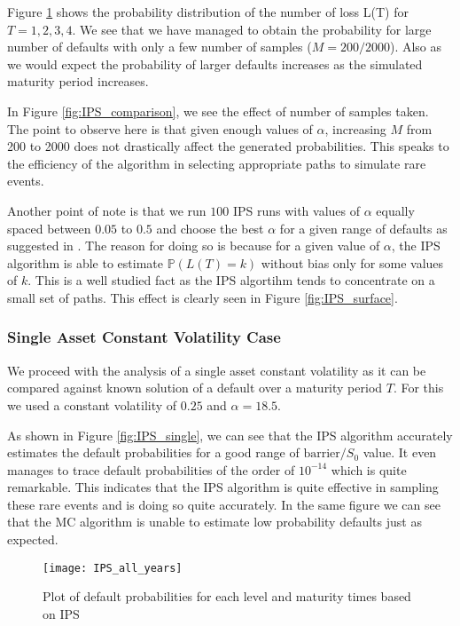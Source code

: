Figure \ref{fig:IPS_all} shows the probability distribution of the number of
loss L(T) for $T = 1, 2, 3, 4$. We see that we have managed to obtain the
probability for large number of defaults with only a few number of samples ($M =
200/2000$). Also as we would expect the probability of larger defaults increases
as the simulated maturity period increases.

In Figure \ref{fig:IPS_comparison}, we see the effect of number of samples
taken. The point to observe here is that given enough values of $\alpha$, 
increasing $M$ from 200 to 2000 does not drastically affect the generated
probabilities. This speaks to the efficiency of the algorithm in selecting
appropriate paths to simulate rare events.

Another point of note is that we run $100$ IPS runs with values of $\alpha$
equally spaced between $0.05$ to $0.5$ and choose the best $\alpha$ for a given
range of defaults as suggested in \cite{carmona2009importance}. The reason for 
doing so is because for a given value of $\alpha$, the IPS algorithm is able to 
estimate $\mathbb{P}(L(T) = k)$ without bias only for some values of $k$. This
is a well studied fact as the IPS algortihm tends to concentrate on a small set
of paths. This effect is clearly seen in Figure \ref{fig:IPS_surface}.

\subsubsection{Single Asset Constant Volatility Case}
We proceed with the analysis of a single asset constant volatility as it can be
compared against known solution of a default over a maturity period $T$. For
this we used a constant volatility of $0.25$ and $\alpha = 18.5$.

As shown in Figure \ref{fig:IPS_single},  we can see that the IPS algorithm
accurately estimates the default probabilities for a good range of
$\text{barrier}/S_0$ value. It even manages to trace default probabilities of the 
order of $10^{-14}$ which is quite remarkable. This indicates that the IPS
algorithm is quite effective in sampling these rare events and is doing so quite
accurately. In the same figure we can see that the MC algorithm is unable to
estimate low probability defaults just as expected.

\begin{figure}
	\centering
	\texttt{[image: IPS\_all\_years]}
	\caption{Plot of default probabilities for each level and maturity times
	based on IPS}
	\label{fig:IPS_all}
\end{figure}

